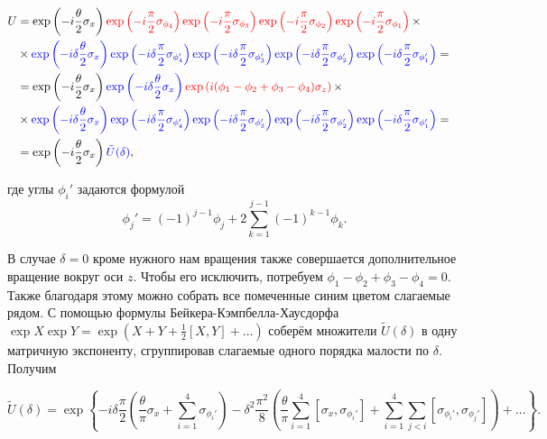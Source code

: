 \begin{equation}
\begin{aligned}
	U &= \exp\left( - i \frac{\theta}{2} \sigma_x \right)
	\begingroup\color{red}\exp\left( - i \frac{\pi}{2} \sigma_{\phi_4}\right)\exp\left( - i \frac{\pi}{2} \sigma_{\phi_3}\right)\exp\left( - i \frac{\pi}{2} \sigma_{\phi_2}\right)\exp\left( - i \frac{\pi}{2} \sigma_{\phi_1}\right)\endgroup \times &\\
	&\times \begingroup\color{blue}\exp\left( - i\delta \frac{\theta}{2} \sigma_x \right)\exp\left( - i \delta \frac{\pi}{2} \sigma_{\phi_4'}\right)\exp\left( - i \delta \frac{\pi}{2} \sigma_{\phi_3'}\right)\exp\left( - i \delta \frac{\pi}{2} \sigma_{\phi_2'}\right)\exp\left( - i \delta \frac{\pi}{2} \sigma_{\phi_1'}\right)\endgroup =& \\
	&= \exp\left( - i \frac{\theta}{2} \sigma_x \right)\begingroup\color{blue}\exp\left( - i \delta \frac{\theta}{2} \sigma_x \right)\endgroup\begingroup\color{red}\exp\left(i(\phi_1 - \phi_2 + \phi_3 - \phi_4)\sigma_z\right)\endgroup \times & \\
	&\times \begingroup\color{blue}\exp\left( - i\delta \frac{\theta}{2} \sigma_x \right)\exp\left( - i \delta \frac{\pi}{2} \sigma_{\phi_4'}\right)\exp\left( - i \delta \frac{\pi}{2} \sigma_{\phi_3'}\right)\exp\left( - i \delta \frac{\pi}{2} \sigma_{\phi_2'}\right)\exp\left( - i \delta \frac{\pi}{2} \sigma_{\phi_1'}\right)\endgroup =&\\
	&= \exp\left( - i \frac{\theta}{2} \sigma_x \right) \begingroup\color{blue}\tilde{U}(\delta)\endgroup,
\end{aligned}
\end{equation}

где углы $\phi_i'$ задаются формулой 
\begin{equation}
	\phi_j' = (-1)^{j-1}\phi_j + 2\sum_{k=1}^{j-1}(-1)^{k-1}\phi_k.
\end{equation}


В случае $\delta = 0$ кроме нужного нам вращения также совершается дополнительное вращение вокруг оси $z$. Чтобы его исключить, потребуем $\phi_1 - \phi_2 + \phi_3 - \phi_4 = 0$. Также благодаря этому можно собрать все помеченные синим цветом слагаемые рядом. С помощью формулы Бейкера-Кэмпбелла-Хаусдорфа $\exp{X} \exp{Y} = \exp{\left(X + Y + \frac{1}{2}\left[X, Y \right] + \ldots\right)}$ соберём множители $\tilde{U}(\delta)$ в одну матричную экспоненту, сгруппировав слагаемые одного порядка малости по $\delta$. Получим

\begin{equation}
	\tilde{U}(\delta) = \exp{\left\{ -i\delta \frac{\pi}{2}\left(\frac{\theta}{\pi}\sigma_x + \sum_{i=1}^{4}\sigma_{\phi_i'} \right) - \delta^2 \frac{\pi^2}{8}\left(\frac{\theta}{\pi}\sum_{i=1}^{4}[\sigma_x,\sigma_{\phi_i'}]+
	\sum_{i=1}^{4} \sum_{j<i} \left[\sigma_{\phi_i'},\sigma_{\phi_j'}\right]\right)+\ldots \right\}}.
\end{equation}

